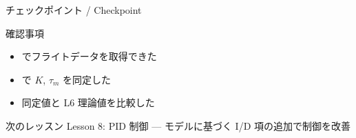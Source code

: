 \begin{frame}{チェックポイント / Checkpoint}
  \begin{alertblock}{確認事項}
    \begin{itemize}
      \item[$\square$]  でフライトデータを取得できた
      \item[$\square$]  で $K$, $\tau_m$ を同定した
      \item[$\square$] 同定値と L6 理論値を比較した
    \end{itemize}
  \end{alertblock}

  \vspace{1em}

  \begin{block}{次のレッスン}
    Lesson 8: PID 制御 --- モデルに基づく I/D 項の追加で制御を改善
  \end{block}
\end{frame}
